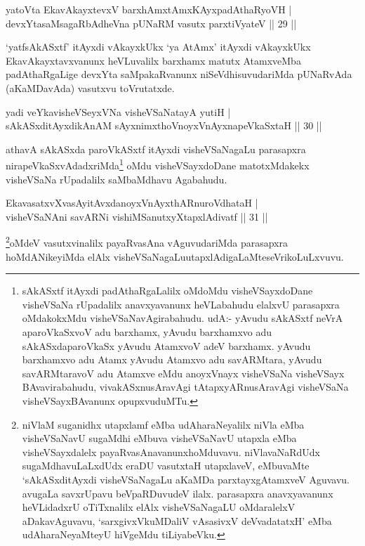 \begin{shl}
yatoV\s ta EkavAkayxtevxV barxhAmxtAmxKAyxpadAthaRyoVH |\\
devxYtasaMsagaRbAdheVna pUNaRM vasutx parxtiVyateV \hfill || 29 ||
\end{shl}

\begin{artha}
`yatfsAkASxtf' itAyxdi vAkayxkUkx `ya AtAmx' itAyxdi vAkayxkUkx EkavAkayxtavxvanunx heVLuvalilx barxhamx 
matutx AtamxveMba padAthaRgaLige devxYta saMpakaRvanunx niSeVdhisuvudariMda pUNaRvAda (aKaMDavAda) vasutxvu 
toVrutatxde.
\end{artha}


\begin{shl}
yadi veYkavisheVSeyxVNa visheVSaNatayA yutiH |\\
sAkASxditAyxdikAnAM sAyxnimxthoV\s noyxVnAyxnapeVkaSxtaH \hfill || 30 ||
\end{shl}

\begin{artha}
athavA  sAkASxda paroVkASxtf itAyxdi visheVSaNagaLu parasapxra nirapeVkaSxvAdadxriMda\footnote{sAkASxtf itAyxdi padAthaRgaLalilx oMdoMdu visheVSayxdoDane visheVSaNa rUpadalilx anavxyavanunx heVLabahudu elalxvU parasapxra oMdakokxMdu visheVSaNavAgirabahudu. udA:- yAvudu sAkASxtf neVrA aparoVkaSxvoV adu barxhamx, yAvudu barxhamxvo adu sAkASxdaparoVkaSx yAvudu AtamxvoV adeV barxhamx. yAvudu barxhamxvo adu Atamx yAvudu Atamxvo adu savARMtara, yAvudu savARMtaravoV adu Atamxve eMdu anoyxVnayx visheVSaNa visheVSayx BAvavirabahudu, vivakASxnusAravAgi tAtapxyARnusAravAgi visheVSaNa visheVSayxBAvanunx opupxvuduMTu.} oMdu visheVSayxdoDane matotxMdakekx visheVSaNa rUpadalilx saMbaMdhavu Agabahudu.
\end{artha}


\begin{shl}
EkavasatxvXvasAyitAvxdanoyxVnAyxthARnuroVdhataH |\\
visheVSaNAni savARNi vishiMSanutxyXtapxlAdivatf \hfill || 31 ||
\end{shl}

\begin{artha}
\footnote{niVlaM suganidhx utapxlamf eMba udAharaNeyalilx niVla eMba visheVSaNavU sugaMdhi eMbuva visheVSaNavU utapxla eMba visheVSayxdalelx payaRvasAnavanunx\break hoMduvavu. niVlavaNaRdUdx sugaMdhavuLaLxdUdx eraDU vasutxtaH utapxlaveV, eMbuvaMte `sAkASxditAyxdi visheVSaNagaLu aKaMDa parxtayxgAtamxveV Aguvavu. avugaLa savxrUpavu beVpaRDuvudeV ilalx. parasapxra anavxyavanunx heVLidadxrU oTiTxnalilx elAlx visheVSaNagaLU oMdaralelxV aDakavAguvavu, `sarxgivxVkuMDaliV vAsasivxV deVvadatatxH' eMba udAharaNeyaMteyU hiVgeMdu tiLiyabeVku.}oMdeV vasutxvinalilx payaRvasAna vAguvudariMda parasapxra hoMdANikeyiMda elAlx visheVSaNagaLu\footnotemark[\value{footnote}]utapxlAdigaLaMte\break seVrikoLuLxvuvu.
\end{artha}

